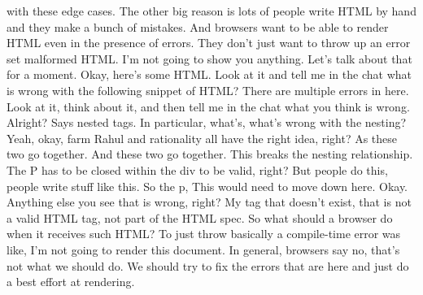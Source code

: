 with these edge cases. The other big reason is lots of people write HTML by hand and they make a bunch of mistakes. And browsers want to be able to render HTML even in the presence of errors. They don't just want to throw up an error set malformed HTML. I'm not going to show you anything. Let's talk about that for a moment. Okay, here's some HTML. Look at it and tell me in the chat what is wrong with the following snippet of HTML? There are multiple errors in here. Look at it, think about it, and then tell me in the chat what you think is wrong. Alright? Says nested tags. In particular, what's, what's wrong with the nesting? Yeah, okay, farm Rahul and rationality all have the right idea, right? As these two go together. And these two go together. This breaks the nesting relationship. The P has to be closed within the div to be valid, right? But people do this, people write stuff like this. So the p, This would need to move down here. Okay. Anything else you see that is wrong, right? My tag that doesn't exist, that is not a valid HTML tag, not part of the HTML spec. So what should a browser do when it receives such HTML? To just throw basically a compile-time error was like, I'm not going to render this document. In general, browsers say no, that's not what we should do. We should try to fix the errors that are here and just do a best effort at rendering. 

